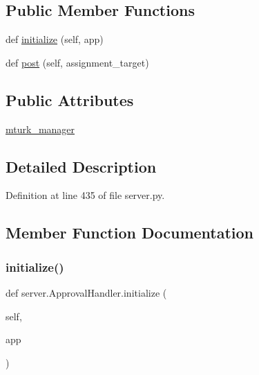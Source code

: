 \subsection*{Public Member Functions}
\begin{DoxyCompactItemize}
\item 
def \hyperlink{classserver_1_1ApprovalHandler_af42ef5da86fe982091a4cbe8bbddebd0}{initialize} (self, app)
\item 
def \hyperlink{classserver_1_1ApprovalHandler_ac4bf954a99f21508d776129b209b1488}{post} (self, assignment\+\_\+target)
\end{DoxyCompactItemize}
\subsection*{Public Attributes}
\begin{DoxyCompactItemize}
\item 
\hyperlink{classserver_1_1ApprovalHandler_abf033570928f1b8b2808a16cfa54f655}{mturk\+\_\+manager}
\end{DoxyCompactItemize}


\subsection{Detailed Description}


Definition at line 435 of file server.\+py.



\subsection{Member Function Documentation}
\mbox{\label{classserver_1_1ApprovalHandler_af42ef5da86fe982091a4cbe8bbddebd0}} 
\subsubsection{\texorpdfstring{initialize()}{initialize()}}
{\footnotesize\ttfamily def server.\+Approval\+Handler.\+initialize (\begin{DoxyParamCaption}\item[{}]{self,  }\item[{}]{app }\end{DoxyParamCaption})}



